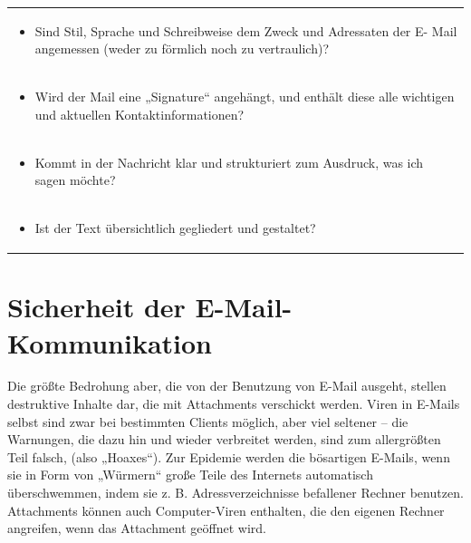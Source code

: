 \documentclass[]{book}
\providecommand{\tightlist}{%
  \setlength{\itemsep}{0pt}\setlength{\parskip}{0pt}}
\theoremstyle{definition}
\theoremstyle{definition}
\theoremstyle{definition}
\theoremstyle{remark}
\begin{document}
\begin{longtable}[]{@{}l@{}}
\begin{minipage}[t]{0.97\columnwidth}\raggedright\strut
\begin{itemize}
\tightlist
\item
  Sind Stil, Sprache und Schreibweise dem Zweck und Adressaten der E-
  Mail angemessen (weder zu förmlich noch zu vertraulich)? \vspace{-6mm}
\end{itemize}\strut
\end{minipage}\tabularnewline
\begin{minipage}[t]{0.97\columnwidth}\raggedright\strut
\begin{itemize}
\tightlist
\item
  Wird der Mail eine „Signature`` angehängt, und enthält diese alle
  wichtigen und aktuellen Kontaktinformationen? \vspace{-6mm}
\end{itemize}\strut
\end{minipage}\tabularnewline
\begin{minipage}[t]{0.97\columnwidth}\raggedright\strut
\begin{itemize}
\tightlist
\item
  Kommt in der Nachricht klar und strukturiert zum Ausdruck, was ich
  sagen möchte? \vspace{-6mm}
\end{itemize}\strut
\end{minipage}\tabularnewline
\begin{minipage}[t]{0.97\columnwidth}\raggedright\strut
\begin{itemize}
\tightlist
\item
  Ist der Text übersichtlich gegliedert und gestaltet?
\end{itemize}\strut
\end{minipage}\tabularnewline
\bottomrule
\end{longtable}

\section{Sicherheit der
E-Mail-Kommunikation}\label{sicherheit-der-e-mail-kommunikation}

Die größte Bedrohung aber, die von der Benutzung von E-Mail ausgeht,
stellen destruktive Inhalte dar, die mit Attachments verschickt werden.
Viren in E-Mails selbst sind zwar bei bestimmten Clients möglich, aber
viel seltener -- die Warnungen, die dazu hin und wieder verbreitet
werden, sind zum allergrößten Teil falsch, (also „Hoaxes``). Zur
Epidemie werden die bösartigen E-Mails, wenn sie in Form von „Würmern``
große Teile des Internets automatisch überschwemmen, indem sie z. B.
Adressverzeichnisse befallener Rechner benutzen. Attachments können auch
Computer-Viren enthalten, die den eigenen Rechner angreifen, wenn das
Attachment geöffnet wird.
\end{document}
